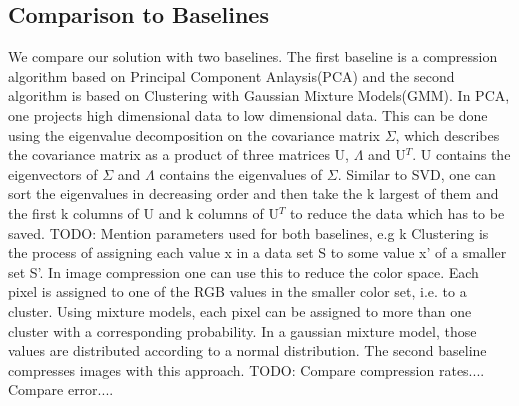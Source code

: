 



\subsection{Comparison to Baselines}
We compare our solution with two baselines. The first baseline is a compression algorithm based on Principal Component Anlaysis(PCA) and the second algorithm is based on Clustering with Gaussian Mixture Models(GMM).  
\newline
In PCA, one projects high dimensional data to low dimensional data. This can be done using the eigenvalue decomposition on the covariance matrix $\Sigma$, which describes the covariance matrix as a product of three matrices U, $\Lambda$ and U$^T$. U contains the eigenvectors of  $\Sigma$ and $\Lambda$ contains the eigenvalues of $\Sigma$. Similar to SVD, one can sort the eigenvalues in decreasing order and then take the k largest of them and the first k columns of U and k columns of U$^T$ to reduce the data which has to be saved. 
\newline
\newline
TODO: Mention parameters used for both baselines, e.g k
\newline
\newline
Clustering is the process of assigning each value x in a data set S to some value x' of a smaller set S'. In image compression one can use this to reduce the color space. Each pixel is assigned to one of the RGB values in the smaller color set, i.e. to a cluster. Using mixture models, each pixel can be assigned to more than one cluster with a corresponding probability. In a gaussian mixture model, those values are distributed according to a normal distribution. The second baseline compresses images with this approach. 
\newline
TODO:
\newline
Compare compression rates.... 
\newline
Compare error....
